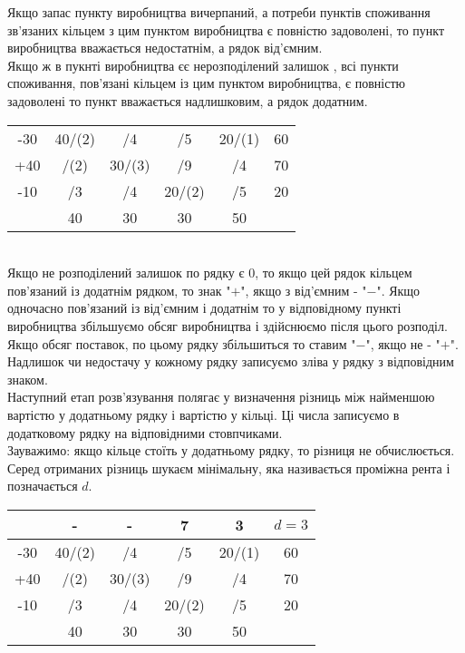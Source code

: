 \documentclass[12pt]{book}
\begin{document}
Якщо запас пункту виробництва вичерпаний, а потреби пунктів споживання зв’язаних кільцем з цим пунктом виробництва є повністю задоволені, то пункт виробництва вважається недостатнім, а рядок від’ємним.\\
Якщо ж в пукнті виробництва єє нерозподілений залишок , всі пункти споживання, пов’язані кільцем із цим пунктом виробництва, є повністю задоволені то пункт вважається надлишковим, а рядок додатним.\\
\begin{tabular}{ | c | c | c | c | c | c | }
\hline
	&		&		&		&		&\\
\hline
-30	&	40/(2)	&	/4	&	/5	&	20/(1)	&	60\\
\hline
+40	&	/(2)	&	30/(3)	&	/9	&	/4	&	70\\
\hline
-10	&	/3	&	/4	&	20/(2)	&	/5	&	20\\
\hline
	&	40	&	30	&	30	&	50	&\\
\hline
\end{tabular}\\
Якщо не розподілений залишок по рядку є $0$, то якщо цей рядок кільцем пов’язаний із додатнім рядком, то знак "$+$", якщо з від’ємним - "$-$". Якщо одночасно пов’язаний із від’ємним і додатнім то у відповідному пункті виробництва збільшуємо обсяг виробництва і здійснюємо після цього розподіл. Якщо обсяг поставок, по цьому рядку збільшиться то ставим "$-$", якщо не - "$+$".\\
Надлишок чи недостачу у кожному рядку записуємо зліва у рядку з відповідним знаком.\\
Наступний етап розв’язування полягає у визначення різниць між найменшою вартістю у додатньому рядку і вартістю у кільці. Ці числа записуємо в додатковому рядку на відповідними стовпчиками.\\
Зауважимо: якщо кільце стоїть у додатньому рядку, то різниця не обчислюється.\\
Серед отриманих різниць шукаєм мінімальну, яка називається проміжна рента і позначається $d$.\\
\begin{tabular}{ | c | c | c | c | c | c | }
\hline
	&	-	&	-	&	7	&	3	&	$d=3$\\
\hline
-30	&	40/(2)	&	/4	&	/5	&	20/(1)	&	60\\
\hline
+40	&	/(2)	&	30/(3)	&	/9	&	/4	&	70\\
\hline
-10	&	/3	&	/4	&	20/(2)	&	/5	&	20\\
\hline
	&	40	&	30	&	30	&	50	&\\
\hline
\end{tabular}\\
\end{document}
